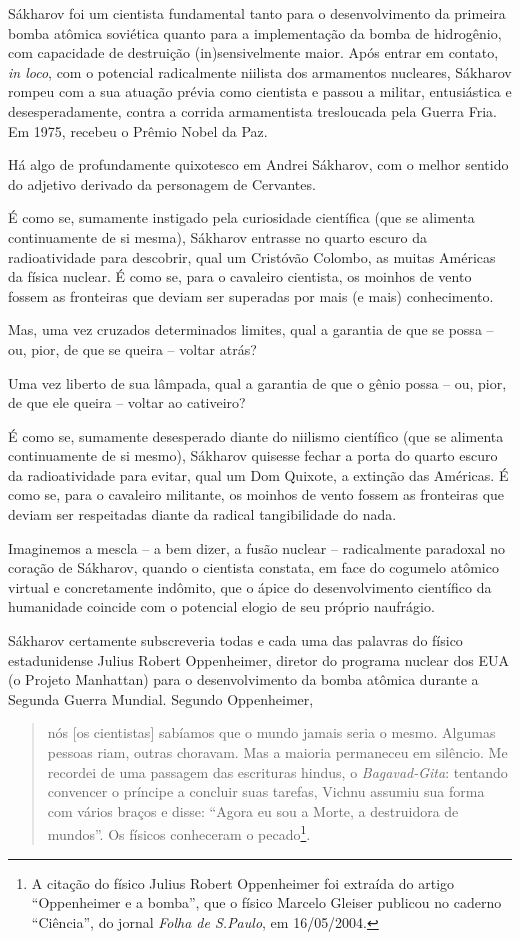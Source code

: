 Sákharov foi um cientista fundamental tanto para o desenvolvimento da
primeira bomba atômica soviética quanto para a implementação da bomba de
hidrogênio, com capacidade de destruição (in)sensivelmente maior. Após
entrar em contato, \emph{in loco}, com o potencial radicalmente niilista
dos armamentos nucleares, Sákharov rompeu com a sua atuação prévia como
cientista e passou a militar, entusiástica e desesperadamente, contra a
corrida armamentista tresloucada pela Guerra Fria. Em 1975, recebeu o
Prêmio Nobel da Paz.

Há algo de profundamente quixotesco em Andrei Sákharov, com o melhor
sentido do adjetivo derivado da personagem de Cervantes.

É como se, sumamente instigado pela curiosidade científica (que se
alimenta continuamente de si mesma), Sákharov entrasse no quarto escuro
da radioatividade para descobrir, qual um Cristóvão Colombo, as muitas
Américas da física nuclear. É como se, para o cavaleiro cientista, os
moinhos de vento fossem as fronteiras que deviam ser superadas por mais
(e mais) conhecimento.

Mas, uma vez cruzados determinados limites, qual a garantia de que se
possa -- ou, pior, de que se queira -- voltar atrás?

Uma vez liberto de sua lâmpada, qual a garantia de que o gênio possa --
ou, pior, de que ele queira -- voltar ao cativeiro?

É como se, sumamente desesperado diante do niilismo científico (que se
alimenta continuamente de si mesmo), Sákharov quisesse fechar a porta do
quarto escuro da radioatividade para evitar, qual um Dom Quixote, a
extinção das Américas. É como se, para o cavaleiro militante, os moinhos
de vento fossem as fronteiras que deviam ser respeitadas diante da
radical tangibilidade do nada.

Imaginemos a mescla -- a bem dizer, a fusão nuclear -- radicalmente
paradoxal no coração de Sákharov, quando o cientista constata, em face
do cogumelo atômico virtual e concretamente indômito, que o ápice do
desenvolvimento científico da humanidade coincide com o potencial elogio
de seu próprio naufrágio.

Sákharov certamente subscreveria todas e cada uma das palavras do físico
estadunidense Julius Robert Oppenheimer, diretor do programa nuclear dos
EUA (o Projeto Manhattan) para o desenvolvimento da bomba atômica
durante a Segunda Guerra Mundial. Segundo Oppenheimer,

\begin{quote}
nós {[}os cientistas{]} sabíamos que o mundo jamais seria o mesmo.
Algumas pessoas riam, outras choravam. Mas a maioria permaneceu em
silêncio. Me recordei de uma passagem das escrituras hindus, o
\emph{Bagavad-Gita}: tentando convencer o príncipe a concluir suas
tarefas, Vichnu assumiu sua forma com vários braços e disse: ``Agora eu
sou a Morte, a destruidora de mundos''. Os físicos conheceram o
pecado\footnote{A citação do físico Julius Robert Oppenheimer foi
  extraída do artigo ``Oppenheimer e a bomba'', que o físico Marcelo
  Gleiser publicou no caderno ``Ciência'', do jornal \emph{Folha de
  S.Paulo}, em 16/05/2004.}.
\end{quote}

